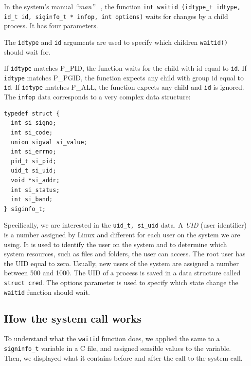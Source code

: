\documentclass{masterthesis}
\begin{document}
In the system's manual \emph{``man''} ~\cite{torvalds2002Linux}, the function \texttt{int waitid (idtype_t idtype, id_t id, siginfo_t * infop, int options)} waits for changes by a child process. It has four parameters.

The \texttt{idtype} and \texttt {id} arguments are used to specify which children \texttt{waitid()} should wait for.

If \texttt{idtype} matches P\_PID, the function waits for the child with id equal to \texttt{id}.
If \texttt{idtype} matches P\_PGID, the function expects any child with group id equal to \texttt{id}.
If \texttt{idtype} matches P\_ALL, the function expects any child and \texttt{id} is ignored.
The \texttt{infop} data corresponds to a very complex data structure:

\begin{lstlisting}
typedef struct {
  int si_signo;
  int si_code;
  union sigval si_value;
  int si_errno;
  pid_t si_pid;
  uid_t si_uid;
  void *si_addr;
  int si_status;
  int si_band;
} siginfo_t;
\end{lstlisting}
Specifically, we are interested in the \texttt{uid\_t, si\_uid} data.
A \emph{UID} (user identifier) is a number assigned by Linux and different for each user on the system we are using.
It is used to identify the user on the system and to determine which system resources, such as files and folders, the user can access.
The root user has the UID equal to zero. Usually, new users of the system are assigned a number between 500 and 1000.
The UID of a process is saved in a data structure called \texttt{struct cred}.
The options parameter is used to specify which state change the \texttt{waitid} function should wait.

\subsection{How the system call works}
\label{subsect:how_waitid}
To understand what the \texttt{waitid} function does, we applied the same to a \texttt{signinfo\_t} variable in a C file, and assigned sensible values to the variable. Then, we displayed what it contains before and after the call to the system call.
\end{document}

